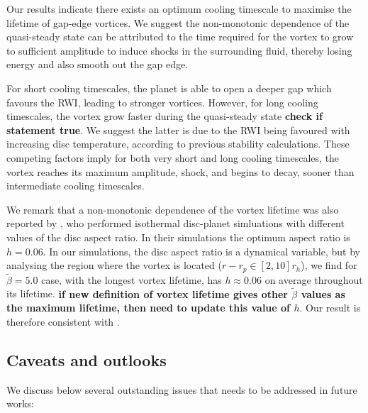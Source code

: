 
Our results indicate there exists an optimum cooling timescale to
maximise the lifetime of gap-edge vortices. We suggest the
non-monotonic dependence of the quasi-steady state can be attributed
to the time required for the vortex to grow to sufficient amplitude to
induce shocks in the surrounding fluid, thereby losing energy and also
smooth out the gap edge.  

For short cooling timescales, the planet is able to open a
deeper gap which favours the RWI, leading to stronger
vortices. However, for long  cooling timescales, the vortex grow
faster during the quasi-steady state {\bf check if statement true}. We
suggest the latter is due to the RWI being favoured with increasing
disc temperature, according to previous stability calculations. These
competing factors imply for both very short and long cooling
timescales, the vortex reaches its maximum amplitude, shock, and
begins to decay, sooner than intermediate cooling timescales.   


We remark that a non-monotonic dependence of the vortex lifetime was
also reported by \cite{fu14}, who performed isothermal disc-planet
simluations with different values of the   
disc aspect ratio. In their simulations the optimum aspect ratio is
$h=0.06$. In our simulations, the disc aspect ratio is a dynamical
variable, but by analysing the region where the vortex is located
($r-r_p\in[2,10]r_h$), %
we find for $\tilde\beta=5.0$ case, with the longest vortex lifetime, has
$h\approx0.06$ on average throughout its lifetime. 
{\bf if new definition of vortex lifetime gives other $\tilde{\beta}$ values as the maximum lifetime, then need to update this value of $h$}. 
Our result is therefore consistent with \citep{fu14}. 


\subsection{Caveats and outlooks}
We discuss below several outstanding issues that needs to be addressed
in future works: 

